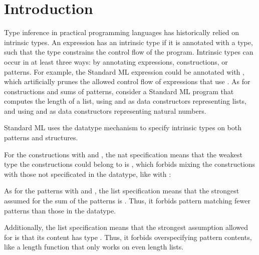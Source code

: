 \documentclass[acmsmall]{acmart}
\theoremstyle{definition}
\begin{document}
\section{Introduction}
\label{sec:introduction}

Type inference in practical programming languages has historically relied on intrinsic types.
An expression has an intrinsic type if it is annotated with a type, such that the type
constrains the control flow of the program.  
Intrinsic types can occur in at least three ways: by annotating
expressions, constructions, or patterns.     
For example, the Standard ML expression 
could be annotated with ,
which artificially prunes the allowed control flow of expressions that use .
As for constructions and sums of patterns, consider a Standard ML program that computes the length of a list,
using  and  as data constructors representing lists, 
and using  and  as data constructors representing natural numbers.


\noindent
Standard ML uses the datatype mechanism to specify intrinsic types on both patterns and structures.


\noindent
For the constructions with  and , the nat specification 
means that the weakest type the constructions could belong to is ,
which forbids mixing the constructions with those not specificated in the datatype, like  with : 


\noindent
As for the patterns with  and , the list specification 
means that the strongest assumed for the sum of the patterns
is . 
Thus, it forbids pattern matching fewer patterns than those in the datatype.


\noindent
Additionally, the list specification 
means that the strongest assumption allowed for  is that its
content has type . Thus, 
it forbids overspecifying pattern contents,
like a length function that only works on even length lists.  
\end{document}
